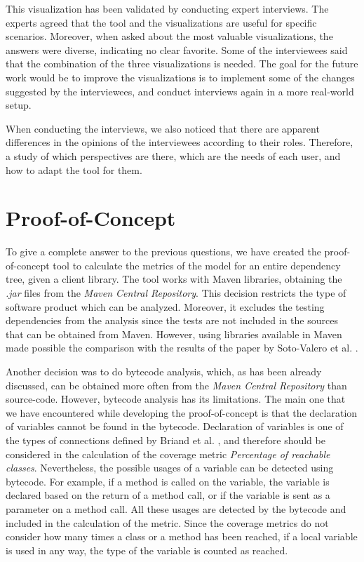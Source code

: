 This visualization has been validated by conducting expert interviews. The experts agreed that the tool and the visualizations are useful for specific scenarios. Moreover, when asked about the most valuable visualizations, the answers were diverse, indicating no clear favorite. Some of the interviewees said that the combination of the three visualizations is needed. The goal for the future work would be to improve the visualizations is to implement some of the changes suggested by the interviewees, and conduct interviews again in a more real-world setup.

When conducting the interviews, we also noticed that there are apparent differences in the opinions of the interviewees according to their roles. Therefore, a study of which perspectives are there, which are the needs of each user, and how to adapt the tool for them.

\section{Proof-of-Concept}

To give a complete answer to the previous questions, we have created the proof-of-concept tool to calculate the metrics of the model for an entire dependency tree, given a client library. The tool works with Maven libraries, obtaining the \textit{.jar} files from the \textit{Maven Central Repository}. This decision restricts the type of software product which can be analyzed. Moreover, it excludes the testing dependencies from the analysis since the tests are not included in the sources that can be obtained from Maven. However, using libraries available in Maven made possible the comparison with the results of the paper by Soto-Valero et al. \cite{soto2020comprehensive}.

Another decision was to do bytecode analysis, which, as has been already discussed, can be obtained more often from the \textit{Maven Central Repository} than source-code. However, bytecode analysis has its limitations. The main one that we have encountered while developing the proof-of-concept is that the declaration of variables cannot be found in the bytecode. Declaration of variables is one of the types of connections defined by Briand et al. \cite{briand1999unified}, and therefore should be considered in the calculation of the coverage metric \textit{Percentage of reachable classes}. Nevertheless, the possible usages of a variable can be detected using bytecode. For example, if a method is called on the variable, the variable is declared based on the return of a method call, or if the variable is sent as a parameter on a method call. All these usages are detected by the bytecode and included in the calculation of the metric. Since the coverage metrics do not consider how many times a class or a method has been reached, if a local variable is used in any way, the type of the variable is counted as reached.

